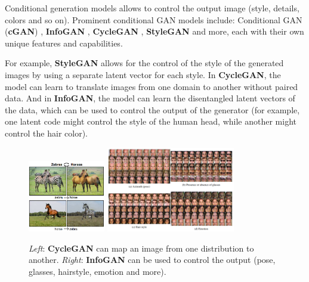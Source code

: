 Conditional generation models allows to control the output image (style, details, colors and so on). Prominent conditional GAN models include: Conditional GAN (\textbf{cGAN}) \cite{cgan}, \textbf{InfoGAN} \cite{infogan}, \textbf{CycleGAN} \cite{cyclegan}, \textbf{StyleGAN} \cite{stylegan} and more, each with their own unique features and capabilities. 

For example, \textbf{StyleGAN} allows for the control of the style of the generated images by using a separate latent vector for each style. In \textbf{CycleGAN}, the model can learn to translate images from one domain to another without paired data. And in \textbf{InfoGAN}, the model can learn the disentangled latent vectors of the data, which can be used to control the output of the generator (for example, one latent code might control the style of the human head, while another might control the hair color).

\begin{figure}
    \centering
    \includegraphics[width=0.3\textwidth]{images/gan/cyclegan.png}
    \includegraphics[width=0.5\textwidth]{images/gan/infogan.png}
    \caption{\textit{Left}: \textbf{CycleGAN} can map an image from one distribution to another. \textit{Right}: \textbf{InfoGAN} can be used to control the output (pose, glasses, hairstyle, emotion and more).}
\end{figure}

